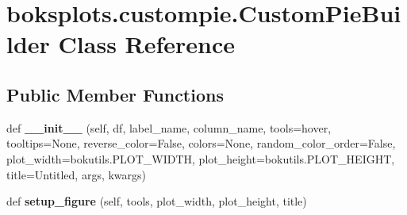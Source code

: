 \hypertarget{classboksplots_1_1custompie_1_1CustomPieBuilder}{}\section{boksplots.\+custompie.\+Custom\+Pie\+Builder Class Reference}
\label{classboksplots_1_1custompie_1_1CustomPieBuilder}
\subsection*{Public Member Functions}
\begin{DoxyCompactItemize}
\item 
\mbox{\label{classboksplots_1_1custompie_1_1CustomPieBuilder_a45b979da6f9e7d9cf8a49bcb5d5e0066}} 
def {\bfseries \+\_\+\+\_\+init\+\_\+\+\_\+} (self, df, label\+\_\+name, column\+\_\+name, tools=\textquotesingle{}hover\textquotesingle{}, tooltips=None, reverse\+\_\+color=False, colors=None, random\+\_\+color\+\_\+order=False, plot\+\_\+width=bokutils.\+P\+L\+O\+T\+\_\+\+W\+I\+D\+TH, plot\+\_\+height=bokutils.\+P\+L\+O\+T\+\_\+\+H\+E\+I\+G\+HT, title=\textquotesingle{}Untitled\textquotesingle{}, args, kwargs)
\item 
\mbox{\label{classboksplots_1_1custompie_1_1CustomPieBuilder_a5a682af1c4a3c98a7fc95df8d16de4b0}} 
def {\bfseries setup\+\_\+figure} (self, tools, plot\+\_\+width, plot\+\_\+height, title)
\end{DoxyCompactItemize}

